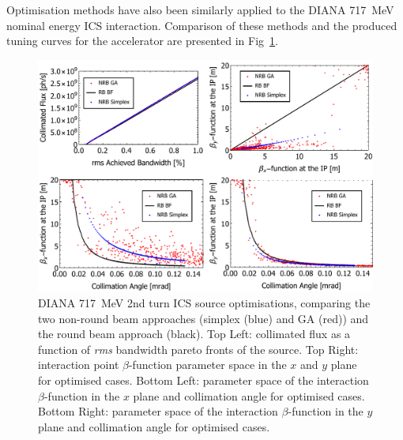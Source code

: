 \documentclass[../main.tex]{subfiles}
\begin{document}
Optimisation methods have also been similarly applied to the DIANA 717~\si{\mega\electronvolt} nominal energy ICS interaction. Comparison of these methods and the produced tuning curves for the accelerator are presented in Fig~\ref{fig:DIANA717_comparison_optimisation}.

\begin{figure}[!h]
\centering
\includegraphics[width=\textwidth]{Figures/DIANA_Inverse_Compton_Source_Design/DIANA_Tuning_Curve_Opt/DIANA717fullcomp.pdf}
\caption{DIANA 717~\si{\mega\electronvolt} 2nd turn ICS source optimisations, comparing the two non-round beam approaches (simplex (blue) and GA (red)) and the round beam approach (black). Top Left: collimated flux as a function of \textit{rms} bandwidth pareto fronts of the source. Top Right: interaction point $\beta$-function parameter space in the $x$ and $y$ plane for optimised cases. Bottom Left: parameter space of the interaction $\beta$-function in the $x$ plane and collimation angle for optimised cases. Bottom Right: parameter space of the interaction $\beta$-function in the $y$ plane and collimation angle for optimised cases.}
\label{fig:DIANA717_comparison_optimisation}
\end{figure}
\end{document}
